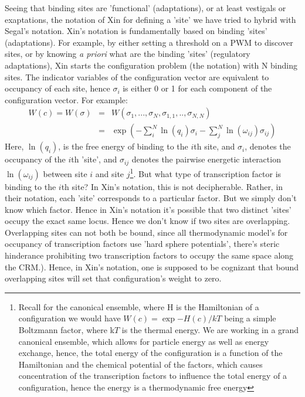 Seeing that binding sites are 'functional' (adaptations), or at least vestigals or exaptations, the notation of Xin for defining a 'site' we have tried to hybrid with Segal's notation.  Xin's notation is fundamentally based on binding 'sites' (adaptations).  For example, by either setting a threshold on a PWM to discover sites, or by knowing \textit{a priori} what are the binding 'sites' (regulatory adaptations), Xin starts the configuration problem (the notation) with N binding sites.  The indicator variables of the configuration vector are equivalent to occupancy of each site, hence $\sigma_i$ is either 0 or 1 for each component of the configuration vector.  For example:
\begin{eqnarray}
W(c)=W(\sigma)&=& W(\sigma_1,...,\sigma_{N} , \sigma_{1,1},..,\sigma_{N,N})\\
&=& \exp{(-\sum_i^N \ln{(q_i)} \sigma_i - \sum_j^N \ln{(\omega_{ij})} \sigma_{ij})}
\end{eqnarray}
Here, $\ln(q_i)$, is the free energy of binding to the $i$th site, and $\sigma_{i}$, denotes the occupancy of the $i$th 'site', and $\sigma_{ij}$ denotes the pairwise energetic interaction $\ln(\omega_{ij})$ between site $i$ and site $j$\footnote{Recall for the canonical ensemble, where H is the Hamiltonian of a configuration we would have  $W(c) = \exp{-H(c)/kT}$ being a simple Boltzmann factor, where k$T$ is the thermal energy.  We are working in a grand canonical ensemble, which allows for particle energy as well as energy exchange, hence, the total energy of the configuration is a function of the Hamiltonian and the chemical potential of the factors, which causes concentration of the transcription factors to influence the total energy of a configuration, hence the energy is a thermodynamic free energy}.  But what type of transcription factor is binding to the $i$th site?  In Xin's notation, this is not decipherable.  Rather, in their notation, each 'site' corresponds to a particular factor.  But we simply don't know which factor.  Hence in Xin's notation it's possible that two distinct 'sites' occupy the exact same locus.  Hence we don't know if two sites are overlapping.  Overlapping sites can not both be bound, since all thermodynamic model's for occupancy of transcription factors use 'hard sphere potentials', there's steric hinderance prohibiting two transcription factors to occupy the same space along the CRM.).  Hence, in Xin's notation, one is supposed to be cognizant that bound overlapping sites will set that configuration's weight to zero. 


